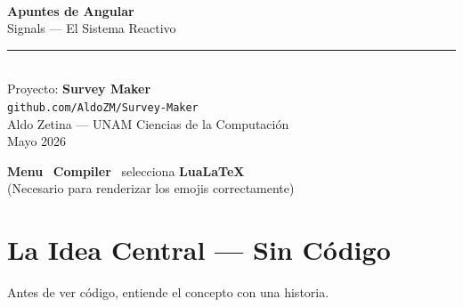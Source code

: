 \documentclass[12pt, a4paper]{article}
\begin{document}
\begin{titlepage}
  \centering
  \vspace*{2.5cm}

  {\fontsize{48}{48}\selectfont {}}\\[0.4cm]
  {\Huge\bfseries\color{azulSignal} Apuntes de Angular}\\[0.4cm]
  {\Large\color{grisCodigo} Signals — El Sistema Reactivo}\\[0.8cm]

  \textcolor{gray!60}{\rule{10cm}{0.8pt}}\\[0.8cm]

  {\large Proyecto: \textbf{Survey Maker}}\\[0.2cm]
  {\normalsize\texttt{\textcolor{morado}{github.com/AldoZM/Survey-Maker}}}\\[0.8cm]

  {\normalsize {} Aldo Zetina — UNAM Ciencias de la Computación}\\[0.2cm]
  {\normalsize {} Mayo 2026}\\[2cm]

  \begin{tcolorbox}[importante, title={\emoji{wrench} Cómo compilar en Overleaf}]
    \textbf{Menu} \textrightarrow\ \textbf{Compiler} \textrightarrow\ selecciona \textbf{LuaLaTeX}\\
    (Necesario para renderizar los emojis correctamente)
  \end{tcolorbox}
\end{titlepage}

\tableofcontents
\newpage

\section{ La Idea Central — Sin Código}

Antes de ver código, entiende el concepto con una historia.
\end{document}
